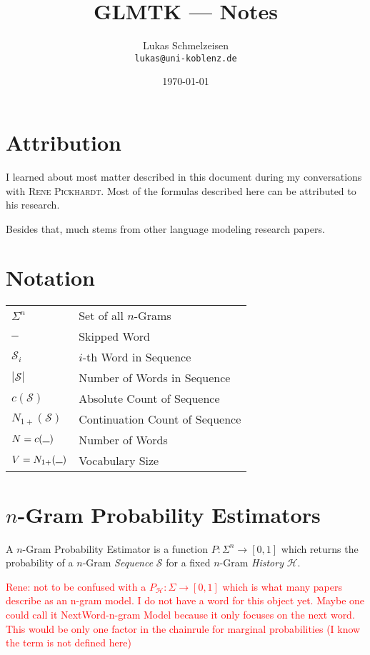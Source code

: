 \documentclass[11pt,a4paper]{article}
\title{GLMTK --- Notes}
\author{Lukas Schmelzeisen \\ \texttt{lukas@uni-koblenz.de}}
\date{\today}
\newcommand{\Seq}{\mathcal{S}}
\newcommand{\Hist}{\mathcal{H}}
\newcommand{\Skp}{\rule{7pt}{.5pt}}
\newcommand{\rp}[1]{\textcolor{red}{Rene: #1}}
\begin{document}
  \maketitle
  \tableofcontents
  \clearpage

  \section{Attribution}

  I learned about most matter described in this document during my
  conversations with \textsc{Rene Pickhardt}. Most of the formulas described
  here can be attributed to his research.

  Besides that, much stems from other language modeling research papers.

  \section{Notation}

  \begin{tabular}{ l l }
    $\Sigma^n$  & Set of all $n$-Grams \\
    $\Skp$ & Skipped Word \\
    $\Seq_i$ & $i$-th Word in Sequence \\
    $|\Seq|$ & Number of Words in Sequence \\
    $c(\Seq)$ & Absolute Count of Sequence \\
    $N_{1+}(\Seq)$ & Continuation Count of Sequence \\
    $N = c(\Skp)$ & Number of Words \\
    $V = N_{1+}(\Skp)$ & Vocabulary Size \\
  \end{tabular}

  \section{$n$-Gram Probability Estimators}

  A $n$-Gram Probability Estimator is a function $P :\Sigma^n \to [0,1]$ which
  returns the probability of a $n$-Gram \emph{Sequence} $\Seq$ for a fixed
  $n$-Gram \emph{History} $\Hist$.

  \rp{not to be confused with a $P_\Hist:\Sigma \to [0,1]$ which is what many
  papers describe as an n-gram model. I do not have a word for this object yet.
  Maybe one could call it NextWord-n-gram Model because it only focuses on the
  next word. This would be only one factor in the chainrule for marginal
  probabilities (I know the term is not defined here)}
\end{document}
